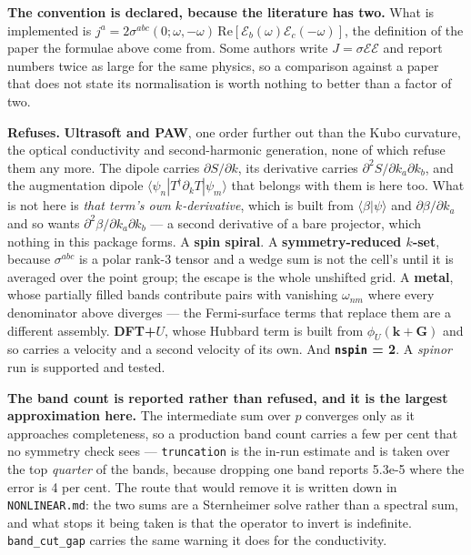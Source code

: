 \documentclass[11pt,a4paper]{article}
\newcommand{\code}[1]{\texttt{\small #1}}
\begin{document}
\textbf{The convention is declared, because the literature has two.} What is
implemented is $j^a = 2\sigma^{abc}(0;\omega,-\omega)\,
\mathrm{Re}[\mathcal E_b(\omega)\mathcal E_c(-\omega)]$, the definition of the
paper the formulae above come from. Some authors write
$J = \sigma\mathcal E\mathcal E$ and report numbers twice as large for the same
physics, so a comparison against a paper that does not state its normalisation
is worth nothing to better than a factor of two.

\begin{refuses}
\textbf{Refuses.} \textbf{Ultrasoft and PAW}, one order further out than the
Kubo curvature, the optical conductivity and second-harmonic generation, none
of which refuse them any more. The
dipole carries $\partial S/\partial k$, its derivative carries
$\partial^2 S/\partial k_a\partial k_b$, and the augmentation dipole
$\langle\psi_n|T^\dagger\partial_k T|\psi_m\rangle$ that belongs with them is
here too. What is not here is \emph{that term's own $k$-derivative}, which is
built from $\langle\beta|\psi\rangle$ and $\partial\beta/\partial k_a$ and so
wants $\partial^2\beta/\partial k_a\partial k_b$ --- a second derivative of a
bare projector, which nothing in this package forms. A
\textbf{spin spiral}. A \textbf{symmetry-reduced $k$-set}, because
$\sigma^{abc}$ is a polar rank-3 tensor and a wedge sum is not the cell's until
it is averaged over the point group; the escape is the whole unshifted grid. A
\textbf{metal}, whose partially filled bands contribute pairs with vanishing
$\omega_{nm}$ where every denominator above diverges --- the Fermi-surface terms
that replace them are a different assembly. \textbf{DFT+$U$}, whose Hubbard term
is built from $\phi_U(\mathbf k + \mathbf G)$ and so carries a velocity and a
second velocity of its own. And \textbf{\code{nspin} = 2}. A \emph{spinor} run
is supported and tested.

\textbf{The band count is reported rather than refused, and it is the largest
approximation here.} The intermediate sum over $p$ converges only as it
approaches completeness, so a production band count carries a few per cent that
no symmetry check sees --- \code{truncation} is the in-run estimate and is taken
over the top \emph{quarter} of the bands, because dropping one band reports
5.3e-5 where the error is 4 per cent. The route that would remove it is written
down in \code{NONLINEAR.md}: the two sums are a Sternheimer solve rather than a
spectral sum, and what stops it being taken is that the operator to invert is
indefinite. \code{band\_cut\_gap} carries the same warning it does for the
conductivity.
\end{refuses}
\end{document}
